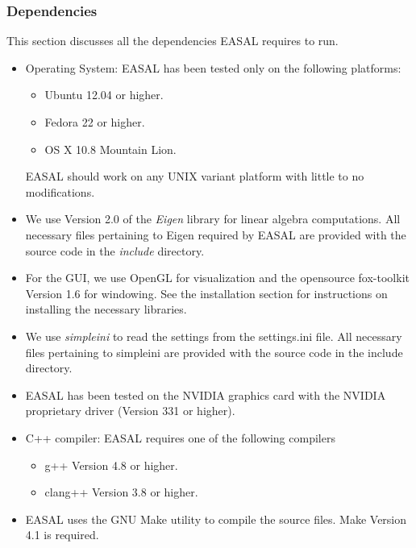 \documentclass[10pt]{article}
\begin{document}
\subsubsection{Dependencies}

This section discusses all the dependencies EASAL requires to run.

\begin{itemize} 
  \item Operating System: EASAL has been tested only on the following platforms:
  \begin{itemize}
	\item Ubuntu 12.04 or higher.
	\item Fedora 22 or higher.
	\item OS X 10.8 Mountain Lion.
\end{itemize}
EASAL  should work on any UNIX variant platform with little to no modifications.

\item We use Version 2.0 of the \emph{Eigen} library for linear algebra
computations. All necessary files pertaining to Eigen required by EASAL are
provided with the source code in the \emph{include} directory.  
   
\item For the GUI, we use OpenGL for visualization and the opensource
fox-toolkit Version 1.6 for windowing. See the installation section for
instructions on installing the necessary libraries.  
		  
\item We use \emph{simpleini} to read the settings from the settings.ini file.
All necessary files pertaining to simpleini are provided with the source code
in the include directory.

\item EASAL has been tested on the NVIDIA graphics card with the NVIDIA
proprietary driver (Version 331 or higher).

\item C++ compiler: EASAL requires one of the following compilers
\begin{itemize}
\item g++ Version 4.8 or higher.
\item clang++ Version 3.8 or higher.
\end{itemize}

\item EASAL uses the GNU Make utility to compile the source files. Make
Version 4.1 is required.
\end{itemize}
\end{document}
